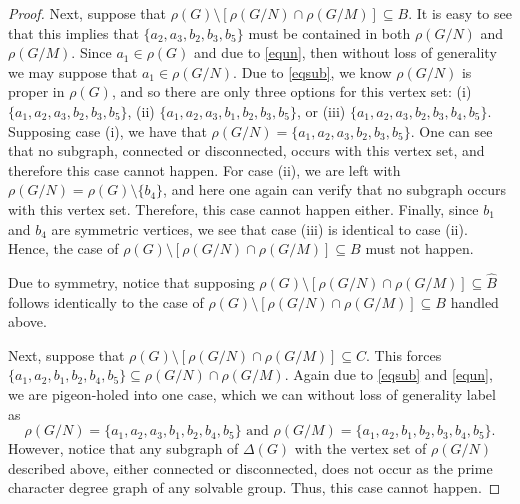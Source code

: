 \documentclass[11pt]{amsart}
\theoremstyle{definition}
\theoremstyle{remark}
\numberwithin{equation}{section}
\begin{document}
\begin{proof}
Next, suppose that $\rho(G)\setminus[\rho(G/N)\cap\rho(G/M)]\subseteq B$. It is easy to see that this implies that $\{a_2,a_3,b_2,b_3,b_5\}$ must be contained in both $\rho(G/N)$ and $\rho(G/M)$. Since $a_1\in\rho(G)$ and due to \eqref{equn}, then without loss of generality we may suppose that $a_1\in\rho(G/N)$. Due to \eqref{eqsub}, we know $\rho(G/N)$ is proper in $\rho(G)$, and so there are only three options for this vertex set: (i) $\{a_1,a_2,a_3,b_2,b_3,b_5\}$, (ii) $\{a_1,a_2,a_3,b_1,b_2,b_3,b_5\}$, or (iii) $\{a_1,a_2,a_3,b_2,b_3,b_4,b_5\}$. Supposing case (i), we have that $\rho(G/N)=\{a_1,a_2,a_3,b_2,b_3,b_5\}$. One can see that no subgraph, connected or disconnected, occurs with this vertex set, and therefore this case cannot happen. For case (ii), we are left with $\rho(G/N)=\rho(G)\setminus\{b_4\}$, and here one again can verify that no subgraph occurs with this vertex set. Therefore, this case cannot happen either. Finally, since $b_1$ and $b_4$ are symmetric vertices, we see that case (iii) is identical to case (ii). Hence, the case of $\rho(G)\setminus[\rho(G/N)\cap\rho(G/M)]\subseteq B$ must not happen.

Due to symmetry, notice that supposing $\rho(G)\setminus[\rho(G/N)\cap\rho(G/M)]\subseteq\widehat{B}$ follows identically to the case of $\rho(G)\setminus[\rho(G/N)\cap\rho(G/M)]\subseteq B$ handled above.

Next, suppose that $\rho(G)\setminus[\rho(G/N)\cap\rho(G/M)]\subseteq C$. This forces $\{a_1,a_2,b_1,b_2,b_4,b_5\}\subseteq\rho(G/N)\cap\rho(G/M)$. Again due to \eqref{eqsub} and \eqref{equn}, we are pigeon-holed into one case, which we can without loss of generality label as
$$
\rho(G/N)=\{a_1,a_2,a_3,b_1,b_2,b_4,b_5\}\text{~and~}\rho(G/M)=\{a_1,a_2,b_1,b_2,b_3,b_4,b_5\}.
$$
However, notice that any subgraph of $\Delta(G)$ with the vertex set of $\rho(G/N)$ described above, either connected or disconnected, does not occur as the prime character degree graph of any solvable group. Thus, this case cannot happen.


\end{proof}
\end{document}
